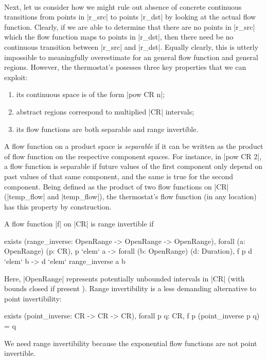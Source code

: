 \documentclass[runningheads]{llncs}
\begin{document}
\

Next, let us consider how we might rule out absence of concrete continuous transitions from points in |r_src| to points |r_dst| by looking at the actual flow function. Clearly, if we are able to determine that there are no points in |r_src| which the flow function maps to points in |r_dst|, then there need be no continuous transition between |r_src| and |r_dst|. Equally clearly, this is utterly impossible to meaningfully overestimate for an general flow function and general regions. However, the thermostat's posesses three key properties that we can exploit:
\begin{enumerate}
\item its continuous space is of the form |pow CR n|;
\item abstract regions correspond to multiplied |CR| intervals;
\item its flow functions are both separable and range invertible.
\end{enumerate}


A flow function on a product space is \emph{separable} if it can be written as the product of flow function on the respective component spaces. For instance, in |pow CR 2|, a flow function is separable if future values of the first component only depend on past values of that same component, and the same is true for the second component. Being defined as the product of two flow functions on |CR| (|temp_flow| and |temp_flow|), the thermostat's flow function (in any location) has this property by construction.

A flow function |f| on |CR| is range invertible if
\begin{code}
  exists (range_inverse: OpenRange -> OpenRange -> OpenRange),
    forall (a: OpenRange) (p: CR), p `elem` a ->
    forall (b: OpenRange) (d: Duration), f p d `elem` b -> d `elem` range_inverse a b
\end{code}
Here, |OpenRange| represents potentially unbounded intervals in |CR| (with bounds closed if present ). Range invertibility is a less demanding alternative to point invertibility:
\begin{code}
  exists (point_inverse: CR -> CR -> CR), forall p q: CR, f p (point_inverse p q) = q
\end{code}
We need range invertibility because the exponential flow functions are not point invertible.
\end{document}
